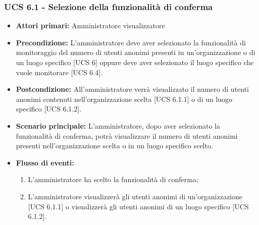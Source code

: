 \subsubsection{UCS 6.1 - Selezione della funzionalità di conferma}
\begin{itemize}
	\item \textbf{Attori primari:} Amministratore visualizzatore
	\item \textbf{Precondizione:} L'amministratore deve aver selezionato la funzionalità di monitoraggio del numero di utenti anonimi presenti in un'organizzazione o di un luogo specifico [UCS 6] oppure deve aver selezionato il luogo specifico che vuole monitorare [UCS 6.4].
	\item \textbf{Postcondizione:} All'amministratore verrà visualizzato il numero di utenti anonimi contenuti nell'organizzazione scelta [UCS 6.1.1] o di un luogo specifico [UCS 6.1.2].
	\item \textbf{Scenario principale:} L'amministratore, dopo aver selezionato la funzionalità di conferma, potrà visualizzare il numero di utenti anonimi presenti nell'organizzazione scelta o in un luogo specifico scelto.
	\item \textbf{Flusso di eventi:} 
	\begin{enumerate}
		\item L'amministratore ha scelto la funzionalità di conferma;
		\item L'amministratore visualizzerà gli utenti anonimi di un'organizzazione [UCS 6.1.1] o visualizzerà gli utenti anonimi di un luogo specifico [UCS 6.1.2].
	\end{enumerate}
\end{itemize}

